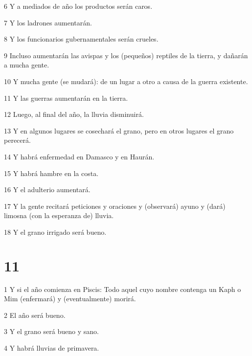 \par 6 Y a mediados de año los productos serán caros.

\par 7 Y los ladrones aumentarán.

\par 8 Y los funcionarios gubernamentales serán crueles.

\par 9 Incluso aumentarán las avispas y los (pequeños) reptiles de la tierra, y dañarán a mucha gente.

\par 10 Y mucha gente (se mudará): de un lugar a otro a causa de la guerra existente.

\par 11 Y las guerras aumentarán en la tierra.

\par 12 Luego, al final del año, la lluvia disminuirá.

\par 13 Y en algunos lugares se cosechará el grano, pero en otros lugares el grano perecerá.

\par 14 Y habrá enfermedad en Damasco y en Haurán.

\par 15 Y habrá hambre en la costa.

\par 16 Y el adulterio aumentará.

\par 17 Y la gente recitará peticiones y oraciones y (observará) ayuno y (dará) limosna (con la esperanza de) lluvia.

\par 18 Y el grano irrigado será bueno.

\chapter{11}

\par 1 Y si el año comienza en Piscis: Todo aquel cuyo nombre contenga un Kaph o Mim (enfermará) y (eventualmente) morirá.

\par 2 El año será bueno.

\par 3 Y el grano será bueno y sano.

\par 4 Y habrá lluvias de primavera.

